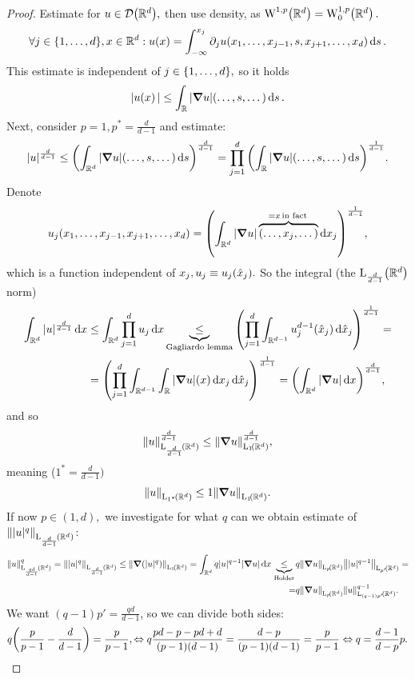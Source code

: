 \documentclass{article}
\begin{document}
\begin{proof}
	Estimate for $u \in \mathcal{D}\qty({\mathbb R}^d),$ then use density, as $\WkpSet[1][p]{\R^{d}} = \WkpzeroSet[1][p]{\R^{d}}.$
	\[
		\forall j \in \{1,\dots,d\}, x \in {\mathbb R}^d: u\qty(x)=\int_{-\infty}^{x_j}\partial_{j}u\qty(x_1,\dots,x_{j-1},s,x_{j+1},\dots,x_d)\dd{s}.
	\]
	This estimate is independent of $j \in \qty{1, \dots,d},$ so it holds 
	\[
		|u\qty(x)| \leq \int_{{\mathbb R}}|\grad u|\qty(\dots,s,\dots)\dd{s}.
	\]
	Next, consider $p=1, p^{*}=\frac{d}{d-1}$ and estimate:
	\[
		|u|^{\frac{d}{d-1}}\leq \qty(\int_{{\mathbb R}^{d}}|\grad u| \qty(\dots, s, \dots)\dd{s})^{\frac{d}{d-1}} = \prod_{j=1}^d\qty(\int_{{\mathbb R}}|\grad u| (\dots, s, \dots) \dd{s})^{\frac{1}{d-1}}.
	\]
	Denote
	\[
		u_j(x_1, \dots, x_{j-1}, x_{j+1}, \dots, x_d) = \qty(\int_{{\mathbb R}^{d}}|\grad u|\overbrace{\qty(\dots, x_j, \dots)}^{=x \, \text{in fact} \,}\dd{x_j})^{\frac{1}{d-1}},
	\]
	which is a function independent of $x_j, u_j \equiv u_j\qty(\hat{x}_j).$
	So the integral (the $\LpSet[\frac{d}{d-1}]{\R^{d}}$ norm)
	\begin{align*}
		\int_{{\mathbb R}^d}|u|^{\frac{d}{d-1}}\dd{x} &\leq \int_{{\mathbb R}^d}\prod_{j=1}^d u_j \dd{x} \underbrace{\leq}_{\text{Gagliardo lemma}}\qty(\prod_{j=1}^d \int_{{\mathbb R}^{d-1}}u_j^{d-1}\qty(\hat{x}_j)\dd{\hat{x}_j})^{\frac{1}{d-1}}=\\
						     &=\qty(\prod_{j=1}^d \int_{{\mathbb R}^{d-1}}\int_{{\mathbb R}}|\grad u|\qty(x)\dd{x_j}\dd{\hat{x}_j})^{\frac{1}{d-1}} = \qty(\int_{{\mathbb R}^d}|\grad u|\dd{x})^{\frac{d}{d-1}},
	\end{align*}
	and so
	\[
		\norm{u}_{\LpSet[\frac{d}{d-1}]{\R^{d}}}^{\frac{d}{d-1}}\leq \norm{\grad u}_{\LpSet[1]{\R^{d}}}^{\frac{d}{d-1}},
	\]
	meaning ($1^{*} = \frac{d}{d-1})$
	\[
		\norm{u}_{\LpSet[1^{*}]{\R^{d}}}\leq 1 \norm{\grad u}_{\LpSet[1]{\R^{d}}}.
	\]
	If now $p \in (1,d),$ we investigate for what $q$ can we obtain estimate of $\norm{|u|^q}_{\LpSet[\frac{d}{d-1}]{\R^{d}}}$:
	\begin{align*}
		\norm{u}_{\LpSet[\frac{qd}{d-1}]{\R^d}}^q = \norm{|u|^q}_{\LpSet[\frac{d}{d-1}]{\R^d}} \leq \norm{\grad (|u|^q)}_{\LpSet[1]{\R^d}} = \int_{\R^d}q|u|^{q-1} |\grad u| \dd{x} \underbrace{\leq}_{\, \text{Holder} \,}&q \norm{\grad u}_{\LpSet[p]{\R^{d}}}\norm{|u|^{q-1}}_{\LpSet[p']{\R^{d}}}= \\
		=&q \norm{\grad u}_{\LpSet[p]{\R^d}} \norm{u}_{\LpSet[(q-1)p']{\R^d}}^{q-1}.
	\end{align*} We want $(q-1)p' = \frac{qd}{d-1}$, so we can divide both sides:
	\[
		q \qty(\frac{p}{p-1} - \frac{d}{d-1}) = \frac{p}{p-1}, \Leftrightarrow q\frac{pd-p-pd+d}{(p-1)(d-1)}=\frac{d-p}{\qty(p-1)\qty(d-1)}=\frac{p}{p-1} \Leftrightarrow q=\frac{d-1}{d-p}p.
\]
\end{proof}
\end{document}
